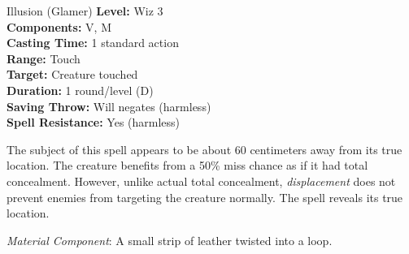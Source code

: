 {Illusion (Glamer)}
{
	\textbf{Level:}
	Wiz 3\\
	\textbf{Components:}
	V, M\\
	\textbf{Casting Time:}
	1 standard action\\
	\textbf{Range:}
	Touch\\
	\textbf{Target:}
	Creature touched\\
	\textbf{Duration:}
	1 round/level (D)\\
	\textbf{Saving Throw:}
	Will negates (harmless)\\
	\textbf{Spell Resistance:}
	Yes (harmless)\\
}
{
	The subject of this spell appears to be about 60 centimeters away from its true location. The creature benefits from a 50\% miss chance as if it had total concealment. However, unlike actual total concealment, \emph{displacement} does not prevent enemies from targeting the creature normally. The spell  reveals its true location.

	\textit{Material Component}:
	A small strip of leather twisted into a loop.

}
